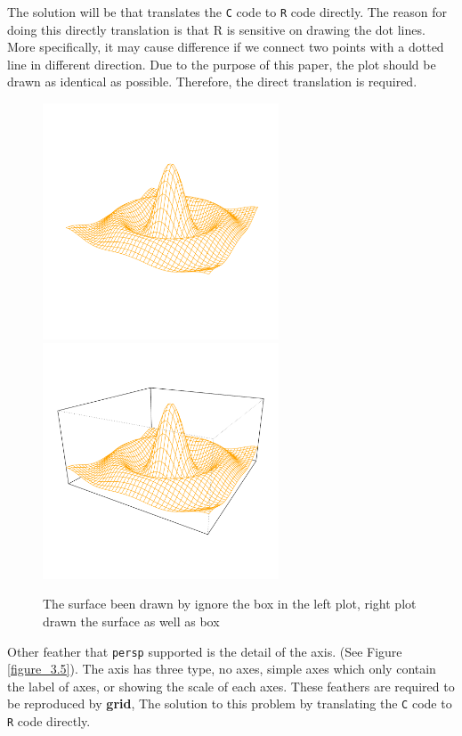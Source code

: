 \documentclass[11pt]{report}
\begin{document}
The solution will be that translates the \texttt{C} code to \texttt{R} code directly. The reason for doing this directly translation is that R is sensitive on drawing the dot lines. More specifically, it may cause difference if we connect two points with a dotted line in different direction. Due to the purpose of this paper, the plot should be drawn as identical as possible. Therefore, the direct translation is required.\\
\begin{figure}[h]
	\begin{center}
		\includegraphics[height = 7cm, width = 7cm]{figure/box_example_1.pdf}
		\includegraphics[height = 7cm, width = 7cm]{figure/box_example_2.pdf}
		\caption{The surface been drawn by ignore the box in the left plot, right plot drawn the surface as well as box}
		\label{figure_3.4}
	\end{center}
\end{figure}

Other feather that \texttt{persp} supported is the detail of the axis. (See Figure \ref{figure_3.5}). The axis has three type, no axes, simple axes which only contain the label of axes, or showing the scale of each axes. These feathers are required to be reproduced by \textbf{grid}, The solution to this problem by translating the \texttt{C} code to \texttt{R} code directly.
\end{document}
